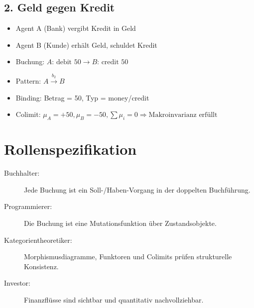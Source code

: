\documentclass{article}
\begin{document}
\subsection*{2. Geld gegen Kredit}

\begin{itemize}
  \item Agent A (Bank) vergibt Kredit in Geld
  \item Agent B (Kunde) erhält Geld, schuldet Kredit
  \item Buchung: \( A: \, \text{debit 50} \rightarrow B: \, \text{credit 50} \)
  \item Pattern: \( A \xrightarrow{b_2} B \)
  \item Binding: Betrag = 50, Typ = money/credit
  \item Colimit: \( \mu_A = +50, \mu_B = -50, \sum \mu_i = 0 \Rightarrow \text{Makroinvarianz erfüllt} \)
\end{itemize}

\section*{Rollenspezifikation}

\begin{description}
  \item[Buchhalter:] Jede Buchung ist ein Soll-/Haben-Vorgang in der doppelten Buchführung.
  \item[Programmierer:] Die Buchung ist eine Mutationsfunktion über Zustandsobjekte.
  \item[Kategorientheoretiker:] Morphismusdiagramme, Funktoren und Colimits prüfen strukturelle Konsistenz.
  \item[Investor:] Finanzflüsse sind sichtbar und quantitativ nachvollziehbar.
\end{description}
\end{document}
